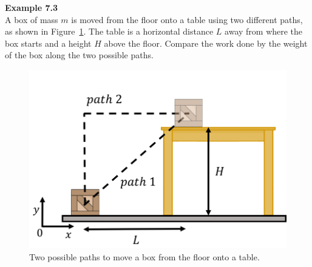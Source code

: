 \begin{framed}
\textbf{Example 7.3}\\
A box of mass $m$ is moved from the floor onto a table using two different paths, as shown in Figure~\ref{fig:workenergy:workgravity}. The table is a horizontal distance $L$ away from where the box starts and a height $H$ above the floor. Compare the work done by the weight of the box along the two possible paths.

\begin{figure}[!htbp]
\centering
\includegraphics[width=0.5\linewidth]{files/workgravity-875d9fb31a6236f7fd29d3cb33642cbf.png}
\caption[]{Two possible paths to move a box from the floor onto a table.}
\label{fig:workenergy:workgravity}
\end{figure}


\end{framed}
